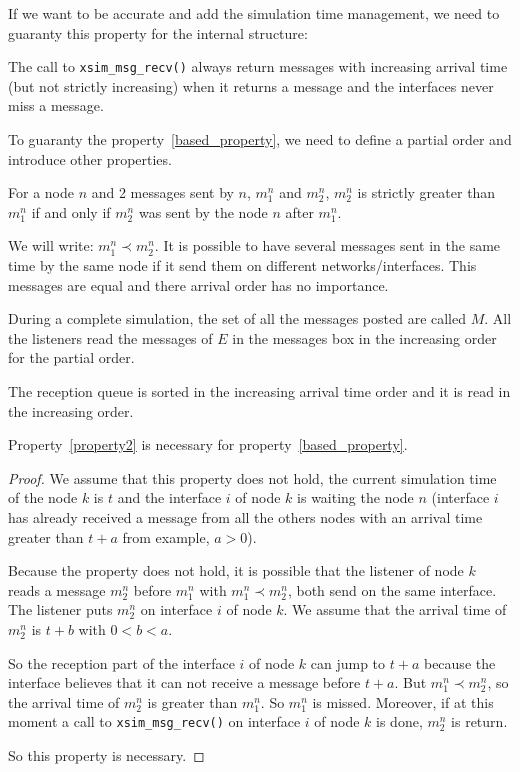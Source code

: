 \label{internal_list}
If we want to be accurate and add the simulation time management, we need 
to guaranty this property for the internal structure:
\begin{myproperty}
\label{based_property}
The call to \verb|xsim_msg_recv()| always return messages with increasing arrival time
(but not strictly increasing) when it returns a message and the interfaces never
miss a message.
\end{myproperty}

To guaranty the property~\ref{based_property}, we need to define a partial order
and introduce other properties.
\begin{mydef}
For a node $n$ and 2 messages sent by $n$, 
$m^n_1$ and $m^n_2$, $m^n_2$ is strictly 
greater than $m^n_1$ if and only if $m^n_2$ was sent by the node $n$ 
after $m^n_1$.
\end{mydef}
We will write: $m^n_1\prec m^n_2$.
It is possible to have several messages sent in the same time by the same node if it
send them on different networks/interfaces. This messages are equal and there arrival
order has no importance.

\begin{myproperty}
\label{property2}
During a complete simulation, the set of all the messages posted are called $M$. 
All the listeners read the messages of $E$ in the messages box in the increasing 
order for the partial order. 
\end{myproperty}

\begin{myproperty}
\label{property3}
The reception queue is sorted
in the increasing arrival time order and it is read in the increasing order.
\end{myproperty}

Property~\ref{property2} is necessary for property~\ref{based_property}.
\begin{proof}
We assume that this property does not hold, the current simulation time of the 
node $k$ is $t$ and the interface $i$ of node $k$ is waiting the 
node $n$ (interface $i$ has already received a message from all the others nodes 
with an arrival time greater than $t+a$ from example, $a>0$).

Because the property does not hold, it is possible that the listener of node $k$ 
reads a message $m^n_2$ before $m^n_1$ with $m^n_1\prec m^n_2$, both send on the
same interface.
The listener puts $m^n_2$ on interface $i$ of node $k$. 
We assume that the arrival time of $m^n_2$ is $t+b$ with $0<b<a$.

So the reception part of the interface $i$ of node $k$ can jump to $t+a$ because the interface
believes that it can not receive a message before $t+a$. But $m^n_1\prec m^n_2$, 
so the arrival time of $m^n_2$ is greater than $m^n_1$.
So $m^n_1$ is missed.
Moreover, if at this moment a 
call to \verb|xsim_msg_recv()| on interface $i$ of node $k$ is done, $m^n_2$ is
return.

So this property is necessary.
\end{proof}

